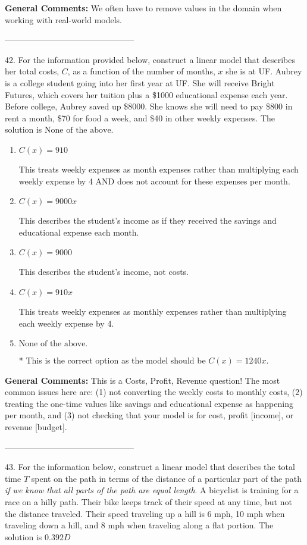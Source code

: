 \documentclass{extbook}[14pt]
\begin{document}
\textbf{General Comments:} We often have to remove values in the domain when working with real-world models.

-----------------------------------------------

42. For the information provided below, construct a linear model that describes her total costs, $C$, as a function of the number of months, $x$ she is at UF. 
Aubrey is a college student going into her first year at UF. She will receive Bright Futures, which covers her tuition plus a \$1000 educational expense each year. Before college, Aubrey saved up \$8000. She knows she will need to pay \$800 in rent a month, \$70 for food a week, and \$40 in other weekly expenses. 
The solution is $ \text{None of the above.} $ 

\begin{enumerate}[label=\Alph*.] 
\item $ C(x) = 910 $ 

 This treats weekly expenses as month expenses rather than multiplying each weekly expense by 4 AND does not account for these expenses per month. 
\item $ C(x) = 9000 x $ 

 This describes the student's income as if they received the savings and educational expense each month. 
\item $ C(x) = 9000 $ 

 This describes the student's income, not costs. 
\item $ C(x) = 910 x $ 

 This treats weekly expenses as monthly expenses rather than multiplying each weekly expense by 4. 
\item $ \text{None of the above.} $ 

 * This is the correct option as the model should be $C(x) = 1240 x$. 
\end{enumerate} 
 
\textbf{General Comments:} This is a Costs, Profit, Revenue question! The most common issues here are: (1) not converting the weekly costs to monthly costs, (2) treating the one-time values like savings and educational expense as happening per month, and (3) not checking that your model is for cost, profit [income], or revenue [budget].

-----------------------------------------------

43. For the information below, construct a linear model that describes the total time $T$ spent on the path in terms of the distance of a particular part of the path \textit{if we know that all parts of the path are equal length}.
A bicyclist is training for a race on a hilly path. Their bike keeps track of their speed at any time, but not the distance traveled. Their speed traveling up a hill is 6 mph, 10 mph when traveling down a hill, and 8 mph when traveling along a flat portion. 
The solution is $ 0.392 D $ 
\end{document}
